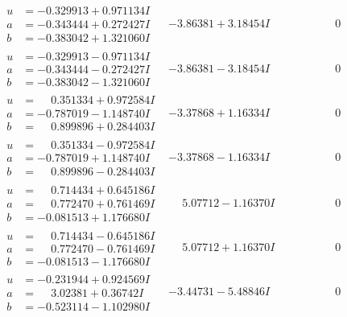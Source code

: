 \documentclass[1p]{elsarticle_modified}
\theoremstyle{definition}
\begin{document}
$$\begin{array}{c|c|c}
\begin{aligned}
u &= -0.329913 + 0.971134 I \\
a &= -0.343444 + 0.272427 I \\
b &= -0.383042 + 1.321060 I\end{aligned}
 & -3.86381 + 3.18454 I & \phantom{-0.000000 } 0 \\ \hline\begin{aligned}
u &= -0.329913 - 0.971134 I \\
a &= -0.343444 - 0.272427 I \\
b &= -0.383042 - 1.321060 I\end{aligned}
 & -3.86381 - 3.18454 I & \phantom{-0.000000 } 0 \\ \hline\begin{aligned}
u &= \phantom{-}0.351334 + 0.972584 I \\
a &= -0.787019 - 1.148740 I \\
b &= \phantom{-}0.899896 + 0.284403 I\end{aligned}
 & -3.37868 + 1.16334 I & \phantom{-0.000000 } 0 \\ \hline\begin{aligned}
u &= \phantom{-}0.351334 - 0.972584 I \\
a &= -0.787019 + 1.148740 I \\
b &= \phantom{-}0.899896 - 0.284403 I\end{aligned}
 & -3.37868 - 1.16334 I & \phantom{-0.000000 } 0 \\ \hline\begin{aligned}
u &= \phantom{-}0.714434 + 0.645186 I \\
a &= \phantom{-}0.772470 + 0.761469 I \\
b &= -0.081513 + 1.176680 I\end{aligned}
 & \phantom{-}5.07712 - 1.16370 I & \phantom{-0.000000 } 0 \\ \hline\begin{aligned}
u &= \phantom{-}0.714434 - 0.645186 I \\
a &= \phantom{-}0.772470 - 0.761469 I \\
b &= -0.081513 - 1.176680 I\end{aligned}
 & \phantom{-}5.07712 + 1.16370 I & \phantom{-0.000000 } 0 \\ \hline\begin{aligned}
u &= -0.231944 + 0.924569 I \\
a &= \phantom{-}3.02381 + 0.36742 I \\
b &= -0.523114 - 1.102980 I\end{aligned}
 & -3.44731 - 5.48846 I & \phantom{-0.000000 } 0 \\ \hline\begin{aligned}

\end{aligned}
\end{array}$$
\end{document}
